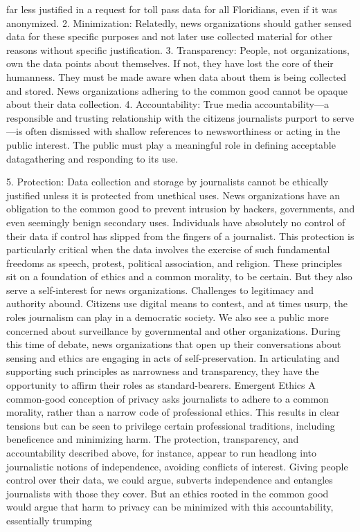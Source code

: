 far less justified in a request for toll pass data for all Floridians, even if it was
anonymized.
2. Minimization: Relatedly, news organizations should gather sensed data
for these specific purposes and not later use collected material for other
reasons without specific justification.
3. Transparency: People, not organizations, own the data points about
themselves. If not, they have lost the core of their humanness. They must
be made aware when data about them is being collected and stored. News
organizations adhering to the common good cannot be opaque about their
data collection.
4. Accountability: True media accountability—a responsible and trusting
relationship with the citizens journalists purport to serve—is often dismissed
with shallow references to newsworthiness or acting in the public
interest. The public must play a meaningful role in defining acceptable datagathering
and responding to its use.

5. Protection: Data collection and storage by journalists cannot be ethically
justified unless it is protected from unethical uses. News organizations
have an obligation to the common good to prevent intrusion by hackers,
governments, and even seemingly benign secondary uses. Individuals have
absolutely no control of their data if control has slipped from the fingers of a
journalist. This protection is particularly critical when the data involves the
exercise of such fundamental freedoms as speech, protest, political association,
and religion.
These principles sit on a foundation of ethics and a common morality, to
be certain. But they also serve a self-interest for news organizations. Challenges
to legitimacy and authority abound. Citizens use digital means to
contest, and at times usurp, the roles journalism can play in a democratic
society. We also see a public more concerned about surveillance by governmental
and other organizations. During this time of debate, news organizations
that open up their conversations about sensing and ethics are engaging
in acts of self-preservation. In articulating and supporting such principles
as narrowness and transparency, they have the opportunity to affirm their
roles as standard-bearers.
Emergent Ethics
A common-good conception of privacy asks journalists to adhere to a common
morality, rather than a narrow code of professional ethics. This results
in clear tensions but can be seen to privilege certain professional traditions,
including beneficence and minimizing harm.
The protection, transparency, and accountability described above, for
instance, appear to run headlong into journalistic notions of independence,
avoiding conflicts of interest. Giving people control over their data, we
could argue, subverts independence and entangles journalists with those
they cover. But an ethics rooted in the common good would argue that harm
to privacy can be minimized with this accountability, essentially trumping

